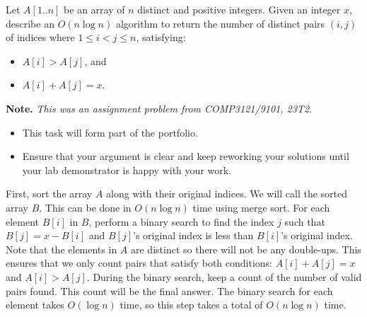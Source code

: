 \documentclass{article}
\begin{document}
\begin{question}
Let $A[1..n]$ be an array of $n$ distinct and positive integers. Given an integer $x$, describe an $O(n \log n)$ algorithm to return the number of distinct pairs $(i, j)$ of indices where $1 \leq i < j \leq n$, satisfying:
\begin{itemize}
    \item $A[i] > A[j]$, and
    \item $A[i] + A[j] = x$.
\end{itemize}

{\bfseries Note.} {\em This was an assignment problem from COMP3121/9101, 23T2.}
\end{question}

\begin{rubric}
\begin{itemize}
    \item This task will form part of the portfolio.
    \item Ensure that your argument is clear and keep reworking your solutions until your lab demonstrator is happy with your work.
\end{itemize}
\end{rubric}

\begin{solution}
First, sort the array $A$ along with their original indices. We will call the sorted array $B$. This can be done in $O(n \log n)$ time using merge sort. For each element $B[i]$ in $B$, perform a binary search to find the index $j$ such that $B[j] = x - B[i]$ and $B[j]$'s original index is less than $B[i]$'s original index. Note that the elements in $A$ are distinct so there will not be any double-ups. This ensures that we only count pairs that satisfy both conditions: $A[i] + A[j] = x$ and $A[i] > A[j]$. During the binary search, keep a count of the number of valid pairs found. This count will be the final answer. The binary search for each element takes $O(\log n)$ time, so this step takes a total of $O(n \log n)$ time.
\end{solution}
\end{document}
